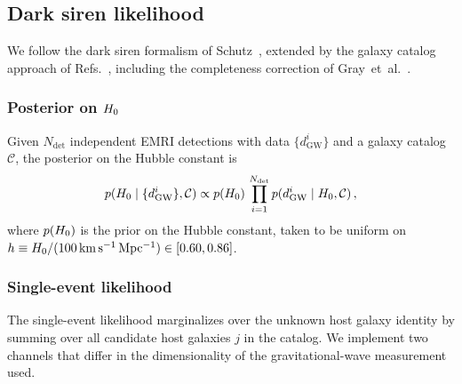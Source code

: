 \subsection{Dark siren likelihood}
\label{sec:likelihood}

We follow the dark siren formalism of
Schutz~\cite{Schutz:1986gp}, extended by the galaxy catalog approach
of Refs.~\cite{Gray:2019ksv,Gair:2022zsa}, including the
completeness correction of Gray~et~al.~\cite{Gray:2019ksv}.

\subsubsection{Posterior on \texorpdfstring{$H_0$}{H0}}

Given $N_\mathrm{det}$ independent EMRI detections with data
$\{d_\mathrm{GW}^i\}$ and a galaxy catalog $\mathcal{C}$, the posterior
on the Hubble constant is
\begin{equation}
  p(H_0 \mid \{d_\mathrm{GW}^i\}, \mathcal{C})
  \propto p(H_0)\,\prod_{i=1}^{N_\mathrm{det}}
  p(d_\mathrm{GW}^i \mid H_0, \mathcal{C}) \,,
  \label{eq:h0_posterior}
\end{equation}
where $p(H_0)$ is the prior on the Hubble constant, taken to be uniform
on $h \equiv H_0/(100\,\mathrm{km\,s^{-1}\,Mpc^{-1}}) \in [0.60, 0.86]$.

\subsubsection{Single-event likelihood}

The single-event likelihood marginalizes over the unknown host galaxy
identity by summing over all candidate host galaxies $j$ in the catalog.
We implement two channels that differ in the dimensionality of the
gravitational-wave measurement used.

